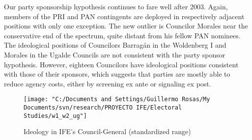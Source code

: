 \documentclass[12 pt, letter]{article}
\begin{document}
Our party sponsorship hypothesis continues to fare well after 2003. Again, members of the PRI and PAN contingents are deployed in respectively adjacent positions with only one exception.  The new outlier is Councilor Morales near the conservative end of the spectrum, quite distant from his fellow PAN nominees. The ideological positions of Councilors Barrag\'an in the Woldenberg I and Morales in the Ugalde Councils are not consistent with the party sponsor hypothesis.  However, eighteen Councilors have ideological positions consistent with those of their sponsors, which suggests that parties are mostly able to reduce agency costs, either by screening ex ante or signaling ex post.

\begin{figure}
\begin{center}
  \texttt{[image: "C:/Documents and Settings/Guillermo Rosas/My Documents/svn/research/PROYECTO IFE/Electoral Studies/w1\_w2\_ug"]}
\caption{Ideology in IFE's Council-General (standardized
range)}\label{F:ideolbars}
\end{center}
\end{figure}
\end{document}
